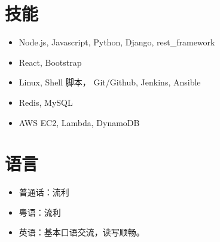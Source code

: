 \documentclass{resume}
\begin{document}
\section{技能}

\begin{itemize}[parsep=0.5ex]
  \item Node.js, Javascript, Python, Django, rest\_framework
  \item React, Bootstrap
  \item Linux, Shell 脚本， Git/Github, Jenkins, Ansible
  \item Redis, MySQL
  \item AWS EC2, Lambda, DynamoDB
\end{itemize}


\section{语言}

\begin{itemize}[parsep=0.5ex]
  \item 普通话：流利
  \item 粤语：流利
  \item 英语：基本口语交流，读写顺畅。
\end{itemize}
\end{document}
